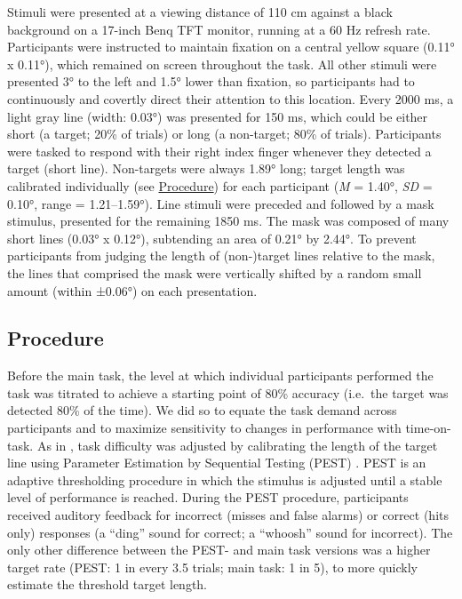 \documentclass[11pt,]{memoir}
\begin{document}
Stimuli were presented at a viewing distance of 110 cm against a black background on a 17-inch Benq TFT monitor, running at a 60 Hz refresh rate. Participants were instructed to maintain fixation on a central yellow square (0.11° x 0.11°), which remained on screen throughout the task. All other stimuli were presented 3° to the left and 1.5° lower than fixation, so participants had to continuously and covertly direct their attention to this location. Every 2000 ms, a light gray line (width: 0.03°) was presented for 150 ms, which could be either short (a target; 20\% of trials) or long (a non-target; 80\% of trials). Participants were tasked to respond with their right index finger whenever they detected a target (short line). Non-targets were always 1.89° long; target length was calibrated individually (see \protect\hyperlink{procedure-1}{Procedure}) for each participant (\emph{M} = 1.40°, \emph{SD} = 0.10°, range = 1.21--1.59°). Line stimuli were preceded and followed by a mask stimulus, presented for the remaining 1850 ms. The mask was composed of many short lines (0.03° x 0.12°), subtending an area of 0.21° by 2.44°. To prevent participants from judging the length of (non-)target lines relative to the mask, the lines that comprised the mask were vertically shifted by a random small amount (within ±0.06°) on each presentation.

\hypertarget{procedure-1}{%
\subsection{Procedure}\label{procedure-1}}

Before the main task, the level at which individual participants performed the task was titrated to achieve a starting point of 80\% accuracy (i.e.~the target was detected 80\% of the time). We did so to equate the task demand across participants and to maximize sensitivity to changes in performance with time-on-task. As in \textcite{MacLean2009}, task difficulty was adjusted by calibrating the length of the target line using Parameter Estimation by Sequential Testing (PEST) \autocite{Taylor1967}. PEST is an adaptive thresholding procedure in which the stimulus is adjusted until a stable level of performance is reached. During the PEST procedure, participants received auditory feedback for incorrect (misses and false alarms) or correct (hits only) responses (a ``ding'' sound for correct; a ``whoosh'' sound for incorrect). The only other difference between the PEST- and main task versions was a higher target rate (PEST: 1 in every 3.5 trials; main task: 1 in 5), to more quickly estimate the threshold target length.
\end{document}
